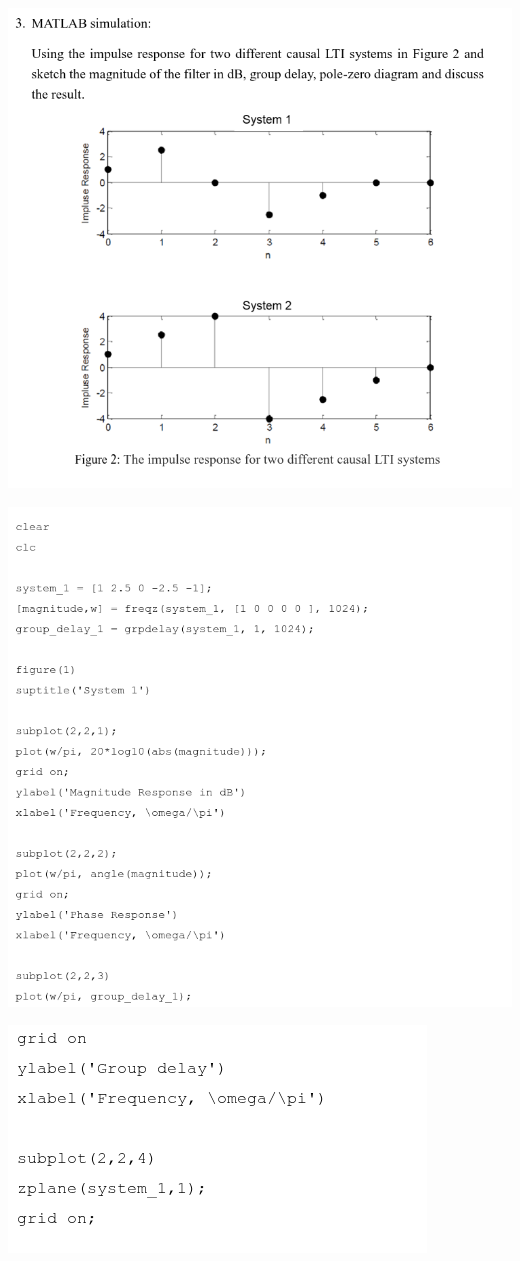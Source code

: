 \documentclass[a4paper]{article}
\begin{document}
	\begin{center}
		\includegraphics[width=0.71\linewidth]{screenshot129}
	\end{center}
	
	\begin{center}
		\includegraphics[width=1\linewidth]{screenshot130}
	\end{center}
	\begin{center}
		\includegraphics[width=1\linewidth]{screenshot131}
	\end{center}
	
	
\newpage

\end{document}
